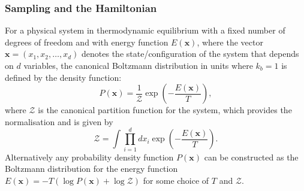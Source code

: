 \documentclass[12pt]{article}
\begin{document}
        \subsubsection{Sampling and the Hamiltonian}
            \label{sec:SamplingAndTheHamiltonian}
            For a physical system in thermodynamic equilibrium with a fixed number of degrees of freedom and with energy function $E\left(\bm{x}\right)$, where the vector $\bm{x} = \left(x_{1},x_{2},\dots,x_{d}\right)$ denotes the state/configuration of the system that depends on $d$ variables, the canonical Boltzmann distribution in units where $k_b=1$ is defined by the density function:
            \begin{equation}
                \label{eq:BoltzmannDistribution}
                P\left(\bm{x}\right) = \frac{1}{\mathcal{Z}} \exp{\left(-\frac{E\left(\bm{x}\right)}{T} \right)},
            \end{equation}
            where $\mathcal{Z}$ is the canonical partition function for the system, which provides the normalisation and is given by 
            \begin{equation}
                \label{eq:JointPartitionFunction}
                \mathcal{Z} = \int\prod_{i=1}^{d}dx_{i} \exp{\left(-\frac{E\left(\bm{x}\right)}{T} \right)}.
            \end{equation}
            Alternatively any probability density function $P\left(\bm{x}\right)$ can be constructed as the Boltzmann distribution for the energy function $ E\left(\bm{x}\right) = -T\left(\log{P\left(\bm{x}\right)} + \log{\mathcal{Z}}\right)$ for some choice of $T$ and $\mathcal{Z}$. 
\end{document}
